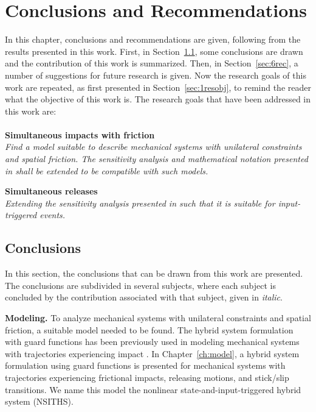 \documentclass[../DC2017114Bouma.tex]{subfiles}
\begin{document}
\graphicspath{{05_Conclusions/img/}}
\renewcommand{\chaptermark}[1]{\markboth{\thechapter.\ #1}{}}
\renewcommand{\sectionmark}[1]{\markright{#1}{}}
\pagestyle{fancyreport}
\cleartooddpage
\pagestyle{fancyreport}
\chapter{Conclusions and Recommendations}\label{ch:concl}
In this chapter, conclusions and recommendations are given, following from the results presented in this work. First, in Section~\ref{sec:6con}, some conclusions are drawn and the contribution of this work is summarized. Then, in Section~\ref{sec:6rec}, a number of suggestions for future research is given. Now the research goals of this work are repeated, as first presented in Section~\ref{sec:1resobj}, to remind the reader what the objective of this work is. The research goals that have been addressed in this work are:\\\\
\textbf{Simultaneous impacts with friction}\\
\textit{Find a model suitable to describe mechanical systems with unilateral constraints and spatial friction. The sensitivity analysis and mathematical notation presented in \cite{Rijnen2018a} shall be extended to be compatible with such models.}

\textbf{Simultaneous releases}\\
\textit{Extending the sensitivity analysis presented in \cite{Rijnen2018a} such that it is suitable for input-triggered events.}

\section{Conclusions}\label{sec:6con}
In this section, the conclusions that can be drawn from this work are presented. The conclusions are subdivided in several subjects, where each subject is concluded by the contribution associated with that subject, given in \textit{italic}.

\textbf{Modeling.} To analyze mechanical systems with unilateral constraints and spatial friction, a suitable model needed to be found. The hybrid system formulation with guard functions has been previously used in modeling mechanical systems with trajectories experiencing impact \cite{Rijnen2018a}. In Chapter~\ref{ch:model}, a hybrid system formulation using guard functions is presented for mechanical systems with trajectories experiencing frictional impacts, releasing motions, and stick/slip transitions. We name this model the nonlinear state-and-input-triggered hybrid system (NSITHS).
\end{document}

